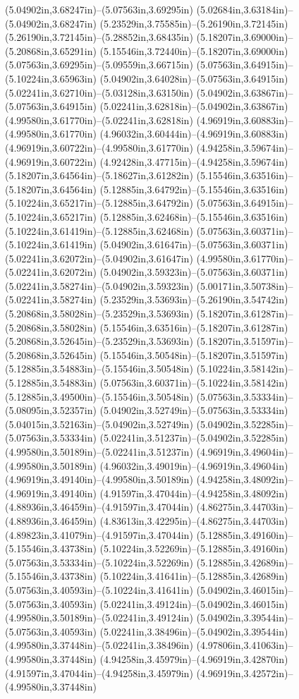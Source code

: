 (5.04902in,3.68247in)--(5.07563in,3.69295in) (5.02684in,3.63184in)--(5.04902in,3.68247in) (5.23529in,3.75585in)--(5.26190in,3.72145in) (5.26190in,3.72145in)--(5.28852in,3.68435in) (5.18207in,3.69000in)--(5.20868in,3.65291in) (5.15546in,3.72440in)--(5.18207in,3.69000in) (5.07563in,3.69295in)--(5.09559in,3.66715in) (5.07563in,3.64915in)--(5.10224in,3.65963in) (5.04902in,3.64028in)--(5.07563in,3.64915in) (5.02241in,3.62710in)--(5.03128in,3.63150in) (5.04902in,3.63867in)--(5.07563in,3.64915in) (5.02241in,3.62818in)--(5.04902in,3.63867in) (4.99580in,3.61770in)--(5.02241in,3.62818in) (4.96919in,3.60883in)--(4.99580in,3.61770in) (4.96032in,3.60444in)--(4.96919in,3.60883in) (4.96919in,3.60722in)--(4.99580in,3.61770in) (4.94258in,3.59674in)--(4.96919in,3.60722in) (4.92428in,3.47715in)--(4.94258in,3.59674in) (5.18207in,3.64564in)--(5.18627in,3.61282in) (5.15546in,3.63516in)--(5.18207in,3.64564in) (5.12885in,3.64792in)--(5.15546in,3.63516in) (5.10224in,3.65217in)--(5.12885in,3.64792in) (5.07563in,3.64915in)--(5.10224in,3.65217in) (5.12885in,3.62468in)--(5.15546in,3.63516in) (5.10224in,3.61419in)--(5.12885in,3.62468in) (5.07563in,3.60371in)--(5.10224in,3.61419in) (5.04902in,3.61647in)--(5.07563in,3.60371in) (5.02241in,3.62072in)--(5.04902in,3.61647in) (4.99580in,3.61770in)--(5.02241in,3.62072in) (5.04902in,3.59323in)--(5.07563in,3.60371in) (5.02241in,3.58274in)--(5.04902in,3.59323in) (5.00171in,3.50738in)--(5.02241in,3.58274in) (5.23529in,3.53693in)--(5.26190in,3.54742in) (5.20868in,3.58028in)--(5.23529in,3.53693in) (5.18207in,3.61287in)--(5.20868in,3.58028in) (5.15546in,3.63516in)--(5.18207in,3.61287in) (5.20868in,3.52645in)--(5.23529in,3.53693in) (5.18207in,3.51597in)--(5.20868in,3.52645in) (5.15546in,3.50548in)--(5.18207in,3.51597in) (5.12885in,3.54883in)--(5.15546in,3.50548in) (5.10224in,3.58142in)--(5.12885in,3.54883in) (5.07563in,3.60371in)--(5.10224in,3.58142in) (5.12885in,3.49500in)--(5.15546in,3.50548in) (5.07563in,3.53334in)--(5.08095in,3.52357in) (5.04902in,3.52749in)--(5.07563in,3.53334in) (5.04015in,3.52163in)--(5.04902in,3.52749in) (5.04902in,3.52285in)--(5.07563in,3.53334in) (5.02241in,3.51237in)--(5.04902in,3.52285in) (4.99580in,3.50189in)--(5.02241in,3.51237in) (4.96919in,3.49604in)--(4.99580in,3.50189in) (4.96032in,3.49019in)--(4.96919in,3.49604in) (4.96919in,3.49140in)--(4.99580in,3.50189in) (4.94258in,3.48092in)--(4.96919in,3.49140in) (4.91597in,3.47044in)--(4.94258in,3.48092in) (4.88936in,3.46459in)--(4.91597in,3.47044in) (4.86275in,3.44703in)--(4.88936in,3.46459in) (4.83613in,3.42295in)--(4.86275in,3.44703in) (4.89823in,3.41079in)--(4.91597in,3.47044in) (5.12885in,3.49160in)--(5.15546in,3.43738in) (5.10224in,3.52269in)--(5.12885in,3.49160in) (5.07563in,3.53334in)--(5.10224in,3.52269in) (5.12885in,3.42689in)--(5.15546in,3.43738in) (5.10224in,3.41641in)--(5.12885in,3.42689in) (5.07563in,3.40593in)--(5.10224in,3.41641in) (5.04902in,3.46015in)--(5.07563in,3.40593in) (5.02241in,3.49124in)--(5.04902in,3.46015in) (4.99580in,3.50189in)--(5.02241in,3.49124in) (5.04902in,3.39544in)--(5.07563in,3.40593in) (5.02241in,3.38496in)--(5.04902in,3.39544in) (4.99580in,3.37448in)--(5.02241in,3.38496in) (4.97806in,3.41063in)--(4.99580in,3.37448in) (4.94258in,3.45979in)--(4.96919in,3.42870in) (4.91597in,3.47044in)--(4.94258in,3.45979in) (4.96919in,3.42572in)--(4.99580in,3.37448in) 